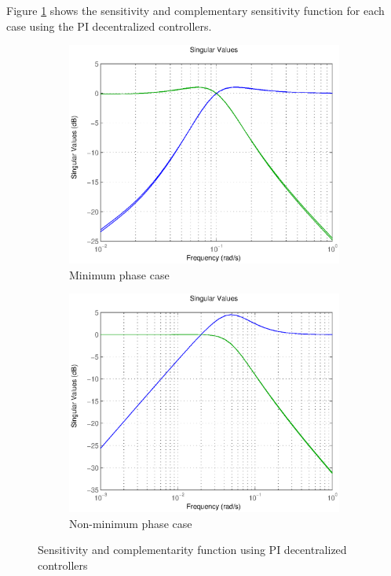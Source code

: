 Figure \ref{sensfunction} shows the sensitivity and complementary sensitivity function for each case using the PI decentralized controllers.

\begin{figure}[h!t]
        \centering
        \begin{subfigure}[b]{0.45\columnwidth}
                \includegraphics[width=\columnwidth]{fig/sensitivity_dyn_minphase.eps}
                \caption{Minimum phase case}
        \end{subfigure}
        \begin{subfigure}[b]{0.45\columnwidth}
                \includegraphics[width=\columnwidth]{fig/sensitivity_dyn_nonminphase.eps}
                \caption{Non-minimum phase case}
        \end{subfigure}
        \caption{Sensitivity and complementarity function using PI decentralized controllers}
        \label{sensfunction}
\end{figure}


